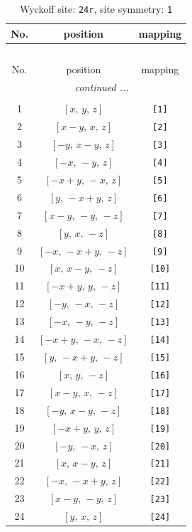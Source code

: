 \documentclass[fleqn,8pt]{jsarticle}
\begin{document}
\begin{longtable}{ccc}
\caption{Wyckoff site: {\tt 24r}, site symmetry: {\tt 1}}
 \\
 \hline \hline
No. & position & mapping \\ \hline \endfirsthead

\multicolumn{2}{l}{\tablename\ \thetable{}} \\
 \hline \hline
No. & position & mapping \\ \hline \endhead

 \hline \hline
\multicolumn{2}{r}{\footnotesize\it continued ...} \\ \endfoot

 \hline \hline
\multicolumn{2}{r}{} \\ \endlastfoot

1 & $\left[ x,\, y,\, z \right]$ & {\tt [1]} \\ \hline
2 & $\left[ x - y,\, x,\, z \right]$ & {\tt [2]} \\ \hline
3 & $\left[ - y,\, x - y,\, z \right]$ & {\tt [3]} \\ \hline
4 & $\left[ - x,\, - y,\, z \right]$ & {\tt [4]} \\ \hline
5 & $\left[ - x + y,\, - x,\, z \right]$ & {\tt [5]} \\ \hline
6 & $\left[ y,\, - x + y,\, z \right]$ & {\tt [6]} \\ \hline
7 & $\left[ x - y,\, - y,\, - z \right]$ & {\tt [7]} \\ \hline
8 & $\left[ y,\, x,\, - z \right]$ & {\tt [8]} \\ \hline
9 & $\left[ - x,\, - x + y,\, - z \right]$ & {\tt [9]} \\ \hline
10 & $\left[ x,\, x - y,\, - z \right]$ & {\tt [10]} \\ \hline
11 & $\left[ - x + y,\, y,\, - z \right]$ & {\tt [11]} \\ \hline
12 & $\left[ - y,\, - x,\, - z \right]$ & {\tt [12]} \\ \hline
13 & $\left[ - x,\, - y,\, - z \right]$ & {\tt [13]} \\ \hline
14 & $\left[ - x + y,\, - x,\, - z \right]$ & {\tt [14]} \\ \hline
15 & $\left[ y,\, - x + y,\, - z \right]$ & {\tt [15]} \\ \hline
16 & $\left[ x,\, y,\, - z \right]$ & {\tt [16]} \\ \hline
17 & $\left[ x - y,\, x,\, - z \right]$ & {\tt [17]} \\ \hline
18 & $\left[ - y,\, x - y,\, - z \right]$ & {\tt [18]} \\ \hline
19 & $\left[ - x + y,\, y,\, z \right]$ & {\tt [19]} \\ \hline
20 & $\left[ - y,\, - x,\, z \right]$ & {\tt [20]} \\ \hline
21 & $\left[ x,\, x - y,\, z \right]$ & {\tt [21]} \\ \hline
22 & $\left[ - x,\, - x + y,\, z \right]$ & {\tt [22]} \\ \hline
23 & $\left[ x - y,\, - y,\, z \right]$ & {\tt [23]} \\ \hline
24 & $\left[ y,\, x,\, z \right]$ & {\tt [24]} \\
\end{longtable}
\end{document}
